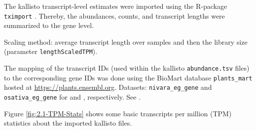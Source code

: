 The kallisto transcript-level estimates were imported using the R-package \verb|tximport| \autocite{R-tximport, tximport2015}. Thereby, the  abundances, counts, and transcript lengths were summarized to the gene level.

Scaling method: average transcript length over samples and then the library size (parameter \verb|lengthScaledTPM|).

The mapping of the transcript IDs (used within the kallisto \verb|abundance.tsv| files) to the corresponding gene IDs was done using the BioMart database \verb|plants_mart| hosted at \url{https://plants.ensembl.org}. Datasets: \verb|nivara_eg_gene| and \verb|osativa_eg_gene| for  and , respectively. See \autocite{R-biomaRt, biomaRt2009}.

Figure \ref{fig:2.1-TPM-Stats} shows some basic transcripts per million (TPM) statistics about the imported kallisto files.

